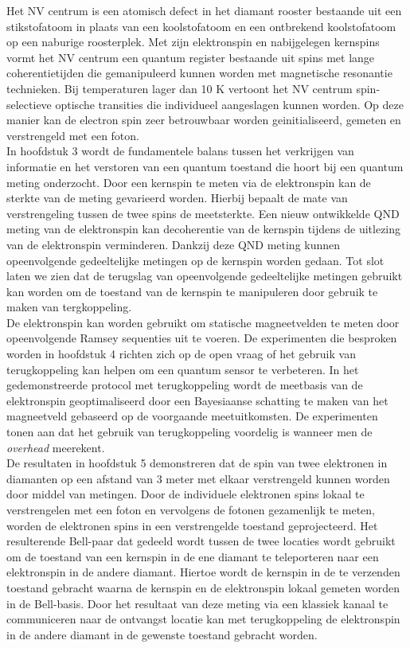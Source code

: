 Het NV centrum is een atomisch defect in het diamant rooster bestaande uit een stikstofatoom in plaats van een koolstofatoom en een ontbrekend koolstofatoom op een naburige roosterplek. Met zijn elektronspin en nabijgelegen kernspins vormt het NV centrum een quantum register bestaande uit spins met lange coherentietijden die gemanipuleerd kunnen worden met magnetische resonantie technieken. Bij temperaturen lager dan 10 K vertoont het NV centrum spin-selectieve optische transities die individueel aangeslagen kunnen worden. Op deze manier kan de electron spin zeer betrouwbaar worden geinitialiseerd, gemeten en verstrengeld met een foton. \\

In hoofdstuk 3 wordt de fundamentele balans tussen het verkrijgen van informatie en het verstoren van een quantum toestand die hoort bij een quantum meting onderzocht. Door een kernspin te meten via de elektronspin kan de sterkte van de meting gevarieerd worden. Hierbij bepaalt de mate van verstrengeling tussen de twee spins de meetsterkte. Een nieuw ontwikkelde QND meting van de elektronspin kan decoherentie van de kernspin tijdens de uitlezing van de elektronspin verminderen. Dankzij deze QND meting kunnen opeenvolgende gedeeltelijke metingen op de kernspin worden gedaan. Tot slot laten we zien dat de terugslag van opeenvolgende gedeeltelijke metingen gebruikt kan worden om de toestand van de kernspin te manipuleren door gebruik te maken van tergkoppeling.\\

De elektronspin kan worden gebruikt om statische magneetvelden te meten door opeenvolgende Ramsey sequenties uit te voeren. De experimenten die besproken worden in hoofdstuk 4 richten zich op de open vraag of het gebruik van terugkoppeling kan helpen om een quantum sensor te verbeteren. In het gedemonstreerde protocol met terugkoppeling wordt de meetbasis van de elektronspin geoptimaliseerd door een Bayesiaanse schatting te maken van het magneetveld gebaseerd op de voorgaande meetuitkomsten. De experimenten tonen aan dat het gebruik van terugkoppeling voordelig is wanneer men de \textit{overhead} meerekent.\\

De resultaten in hoofdstuk 5 demonstreren dat de spin van twee elektronen in diamanten op een afstand van 3 meter met elkaar verstrengeld kunnen worden door middel van metingen. Door de individuele elektronen spins lokaal te verstrengelen met een foton en vervolgens de fotonen gezamenlijk te meten, worden de elektronen spins in een verstrengelde toestand geprojecteerd. Het resulterende Bell-paar dat gedeeld wordt tussen de twee locaties wordt gebruikt om de toestand van een kernspin in de ene diamant te teleporteren naar een elektronspin in de andere diamant. Hiertoe wordt de kernspin in de te verzenden toestand gebracht waarna de kernspin en de elektronspin lokaal gemeten worden in de Bell-basis. Door het resultaat van deze meting via een klassiek kanaal te communiceren naar de ontvangst locatie kan met terugkoppeling de elektronspin in de andere diamant in de gewenste toestand gebracht worden. \\

